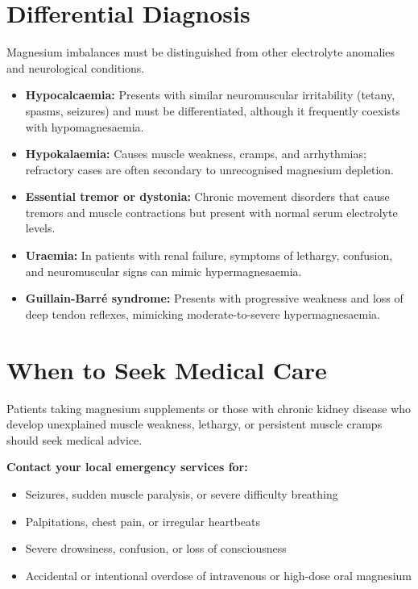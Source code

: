 \section*{Differential Diagnosis}
Magnesium imbalances must be distinguished from other electrolyte anomalies and neurological conditions.
\begin{itemize}
    \item \textbf{Hypocalcaemia:} Presents with similar neuromuscular irritability (tetany, spasms, seizures) and must be differentiated, although it frequently coexists with hypomagnesaemia.
    \item \textbf{Hypokalaemia:} Causes muscle weakness, cramps, and arrhythmias; refractory cases are often secondary to unrecognised magnesium depletion.
    \item \textbf{Essential tremor or dystonia:} Chronic movement disorders that cause tremors and muscle contractions but present with normal serum electrolyte levels.
    \item \textbf{Uraemia:} In patients with renal failure, symptoms of lethargy, confusion, and neuromuscular signs can mimic hypermagnesaemia.
    \item \textbf{Guillain-Barré syndrome:} Presents with progressive weakness and loss of deep tendon reflexes, mimicking moderate-to-severe hypermagnesaemia.
\end{itemize}

\section*{When to Seek Medical Care}
Patients taking magnesium supplements or those with chronic kidney disease who develop unexplained muscle weakness, lethargy, or persistent muscle cramps should seek medical advice.

\textbf{Contact your local emergency services for:}
\begin{itemize}
    \item Seizures, sudden muscle paralysis, or severe difficulty breathing
    \item Palpitations, chest pain, or irregular heartbeats
    \item Severe drowsiness, confusion, or loss of consciousness
    \item Accidental or intentional overdose of intravenous or high-dose oral magnesium
\end{itemize}

